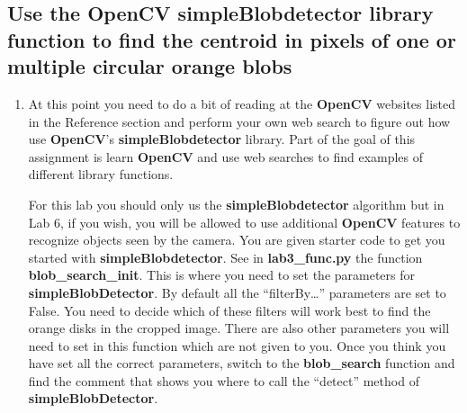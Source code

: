 \subsection{Use the OpenCV simpleBlobdetector library function to find the centroid in pixels of one or multiple circular orange blobs}

\begin{enumerate}

\item At this point you need to do a bit of reading at the \textbf{OpenCV} websites listed in the Reference section and perform your own web search to figure out how use \textbf{OpenCV}’s \textbf{simpleBlobdetector} library.  Part of the goal of this assignment is learn \textbf{OpenCV} and use web searches to find examples of different library functions. 

For this lab you should only us the \textbf{simpleBlobdetector} algorithm but in Lab 6, if you wish, you will be allowed to use additional \textbf{OpenCV} features to recognize objects seen by the camera.  You are given starter code to get you started with \textbf{simpleBlobdetector}.  See in \textbf{lab3\_func.py} the function \textbf{blob\_search\_init}.  This is where you need to set the parameters for \textbf{simpleBlobDetector}.  By default all the “filterBy…” parameters are set to False.  You need to decide which of these filters will work best to find the orange disks in the cropped image.  There are also other parameters you will need to set in this function which are not given to you.  Once you think you have set all the correct parameters, switch to the \textbf{blob\_search} function and find the comment that shows you where to call the “detect” method of \textbf{simpleBlobDetector}.  


\end{enumerate}
